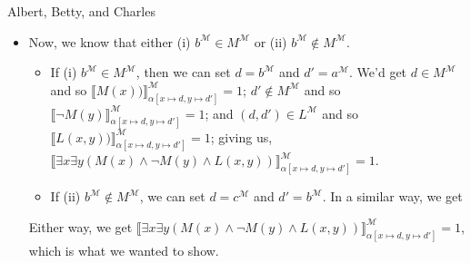 \begin{frame}{Albert, Betty, and Charles}

\begin{itemize}
				
		\item Now, we know that either (i) $b^\mathcal{M}\in M^\mathcal{M}$ or (ii) $b^\mathcal{M}\notin M^\mathcal{M}$. 	
 \begin{itemize}
			
			\item If (i) $b^\mathcal{M}\in M^\mathcal{M}$, then we can set $d=b^\mathcal{M}$ and $d'=a^\mathcal{M}$. We'd get $d\in M^\mathcal{M}$ and so $\llbracket M(x))\rrbracket_{\alpha[x\mapsto d, y\mapsto d']}^\mathcal{M}=1$; $d'\notin M^\mathcal{M}$ and so $\llbracket\neg M(y)\rrbracket_{\alpha[x\mapsto d, y\mapsto d']}^\mathcal{M}=1$; and $( d,d')\in L^\mathcal{M}$ and so $\llbracket L(x,y))\rrbracket_{\alpha[x\mapsto d, y\mapsto d']}^\mathcal{M}=1$; giving us, $\llbracket \exists x\exists y(M(x)\land \neg M(y)\land L(x,y))\rrbracket_{\alpha[x\mapsto d, y\mapsto d']}^\mathcal{M}=1$. 
			
		\item If (ii) $b^\mathcal{M}\notin M^\mathcal{M}$, we can set $d=c^\mathcal{M}$ and $d'=b^\mathcal{M}$. In a similar way, we get 
				
		\end{itemize}

Either way, we get $\llbracket \exists x\exists y(M(x)\land \neg M(y)\land L(x,y))\rrbracket_{\alpha[x\mapsto d, y\mapsto d']}^\mathcal{M}=1$, which is what we wanted to show.

	\end{itemize}

\end{frame}


\begin{frame}

\begin{center}
\huge \smiley
\end{center}

\end{frame}

